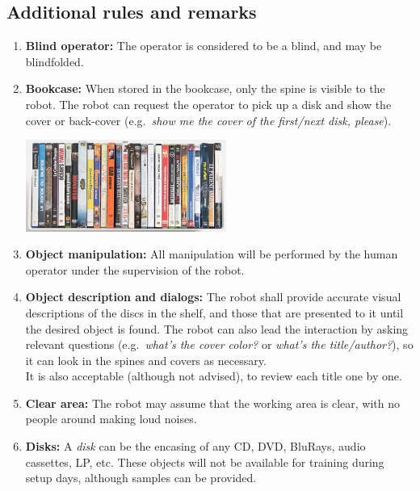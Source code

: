 %
%
\subsection*{Additional rules and remarks}
\begin{enumerate}
	\item \textbf{Blind operator:} The operator is considered to be a blind, and may be blindfolded.

	\item \textbf{Bookcase:} When stored in the bookcase, only the spine is visible to the robot. The robot can request the operator to pick up a disk and show the cover or back-cover (e.g.~\textit{show me the cover of the first/next disk, please}).

	\begin{center}
	\includegraphics[width=\textwidth,height=3cm,keepaspectratio]{images/find_my_disk.png}
	\end{center}

	\item \textbf{Object manipulation:} All manipulation will be performed by the human operator under the supervision of the robot.

	\item \textbf{Object description and dialogs:} The robot shall provide accurate visual descriptions of the discs in the shelf, and those that are presented to it until the desired object is found. The robot can also lead the interaction by asking relevant questions (e.g.~\textit{what's the cover color?} or \textit{what's the title/author?}), so it can look in the spines and covers as necessary.\\
	It is also acceptable (although not advised), to review each title one by one.

	\item \textbf{Clear area:} The robot may assume that the working area is clear, with no people around making loud noises.

	\item \textbf{Disks:} A \textit{disk} can be the encasing of any CD, DVD, BluRays, audio cassettes, LP, etc. These objects will not be available for training during setup days, although samples can be provided.


\end{enumerate}
